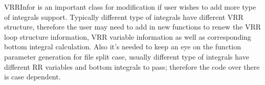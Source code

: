 VRRInfor is an important class for modification if user wishes to add more type of integrals support.
Typically different type of integrals have different VRR structure, therefore the user may need 
to add in new functions to renew the VRR loop structure information, VRR variable information 
as well as corresponding bottom integral calculation. Also it's needed to keep an eye on the function
parameter generation for file split case, usually different type of integrals have different RR
variables and bottom integrals to pass; therefore the code over there is case dependent.


